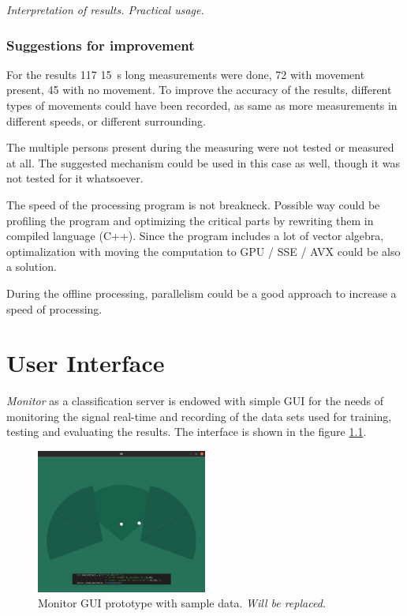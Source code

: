 {\it Interpretation of results. Practical usage. }


\subsection*{Suggestions for improvement}
For the results 117 15~s long measurements were done, 72 with movement present, 45 with no movement.
To improve the accuracy of the results, different types of movements could have been recorded, as same
as more measurements in different speeds, or different surrounding.

The multiple persons present during the measuring were not tested or measured at all. The suggested mechanism
could be used in this case as well, though it was not tested for it whatsoever.

The speed of the processing program is not breakneck. Possible way could be profiling the program and optimizing
the critical parts by rewriting them in compiled language (C++). Since the program includes a lot of vector
algebra, optimalization with moving the computation to GPU / SSE / AVX could be also a solution.

During the offline processing, parallelism could be a good approach to increase a speed of processing.




\chapter{User Interface}
\label{Label:UI}

{\it Monitor} as a classification server is endowed with simple GUI for the needs of monitoring
the signal real-time and recording of the data sets used for training, testing and evaluating the results.
The interface is shown in the figure \ref{fig:monitorGUI}.

\begin{figure}[h!]
\begin{center}
\includegraphics[width=0.5\textwidth]{img/visualizer.png}
\caption{Monitor GUI prototype with sample data. {\it Will be replaced.} \label{fig:monitorGUI}}
\end{center}
\end{figure}

